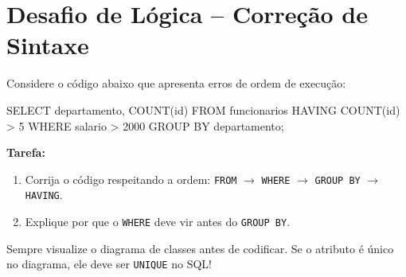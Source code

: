 \documentclass[12pt]{article}
\begin{document}
\hrulefill

\section*{Desafio de Lógica – Correção de Sintaxe}

Considere o código abaixo que apresenta erros de ordem de execução:

\begin{sqlcode}
SELECT departamento, COUNT(id)
FROM funcionarios
HAVING COUNT(id) > 5
WHERE salario > 2000
GROUP BY departamento;
\end{sqlcode}

\textbf{Tarefa:}
\begin{enumerate}
    \item Corrija o código respeitando a ordem: \texttt{FROM} $\rightarrow$ \texttt{WHERE} $\rightarrow$ \texttt{GROUP BY} $\rightarrow$ \texttt{HAVING}.
    \item Explique por que o \texttt{WHERE} deve vir antes do \texttt{GROUP BY}.
\end{enumerate}



\begin{tcolorbox}[colback=green!5,colframe=green!40!black,title=Dica Final]
Sempre visualize o diagrama de classes antes de codificar. Se o atributo é único no diagrama, ele deve ser \texttt{UNIQUE} no SQL!
\end{tcolorbox}
\end{document}
